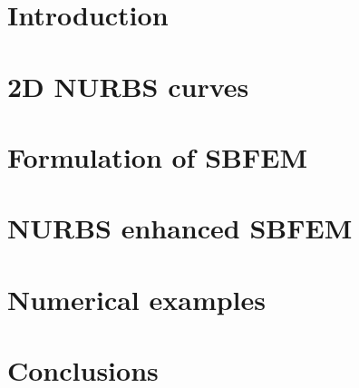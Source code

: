 
\section{Introduction}

\section{2D NURBS curves}
    
    
\section{Formulation of SBFEM}

\section{NURBS enhanced SBFEM}
    

\section{Numerical examples}
    
\section{Conclusions}